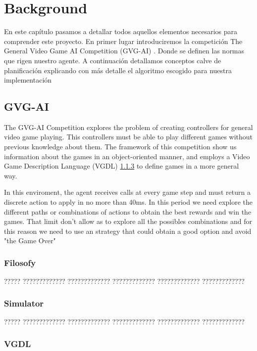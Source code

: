 \chapter{Background}
En este capítulo pasamos a detallar todos aquellos elementos necesarios para comprender este proyecto.
En primer lugar introduciremos la  competición The General Video Game AI Competition (GVG-AI) \cite{gvgai}. Donde se definen las normas que rigen nuestro agente. A continuación detallamos conceptos calve de planificación explicando con más detalle el algoritmo escogido para nuestra implementación

\section{GVG-AI}
The GVG-AI Competition explores the problem of creating controllers for general video game playing.
This controllers must be able to play different games without previous knowledge about them.
The framework of this competition show us information about the games in an object-oriented manner, and employs a Video Game Description Language (VGDL) \ref{vgdl-section} to define games in a more general way.

In this enviroment, the agent receives
calls at every game step and must return a discrete
action to apply in no more than 40ms. In this period we need explore the different paths or combinations of actions to obtain the best rewards and win the games. That limit don't allow as to explore all the possibles combinations and for this reason we need to use an strategy that could obtain a good option and avoid "the Game Over"

\subsection{Filosofy}

????? ????????????? ????????????? ????????????? ????????????? ????????????? 

\subsection{Simulator}

????? ????????????? ????????????? ????????????? ????????????? ????????????? 

\subsection{VGDL} \label{vgdl-section}

